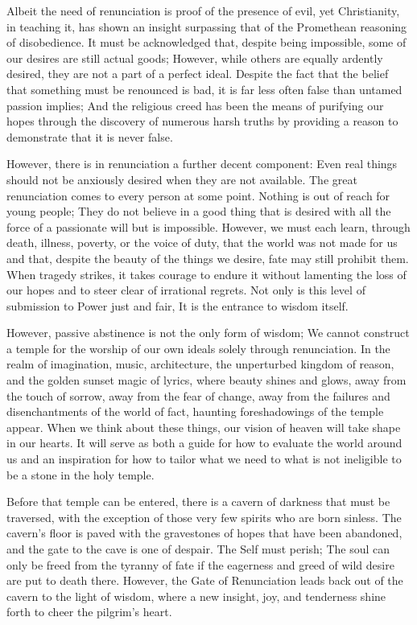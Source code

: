 \documentclass[a4paper,12pt]{book}[2004/02/16]
\theoremstyle{ilemma}
\theoremstyle{itheorem}
\theoremstyle{iother}
\theoremstyle{icorollary}
\theoremstyle{numcorollary}
\theoremstyle{idefinition}
\begin{document}
Albeit the need of renunciation is proof of the presence of
evil, yet Christianity, in teaching it, has shown an insight surpassing
that of the Promethean reasoning of disobedience. It must be acknowledged that, despite being impossible, some of our desires are still actual goods; However, while others are equally ardently desired, they are not a part of a perfect ideal. Despite the fact that the belief that something must be renounced is bad, it is far less often false than untamed passion implies; And the religious creed has been the means of purifying our hopes through the discovery of numerous harsh truths by providing a reason to demonstrate that it is never false.

However, there is in renunciation a further decent component: Even real things should not be anxiously desired when they are not available. The great renunciation comes to every person at some point. Nothing is out of reach for young people; They do not believe in a good thing that is desired with all the force of a passionate will but is impossible. However, we must each learn, through death, illness, poverty, or the voice of duty, that the world was not made for us and that, despite the beauty of the things we desire, fate may still prohibit them. When tragedy strikes, it takes courage to endure it without lamenting the loss of our hopes and to steer clear of irrational regrets. Not only is this level of submission to Power just and fair, It is the entrance to wisdom itself.

However, passive abstinence is not the only form of wisdom; We cannot construct a temple for the worship of our own ideals solely through renunciation. In the realm of imagination, music, architecture, the unperturbed kingdom of reason, and the golden sunset magic of lyrics, where beauty shines and glows, away from the touch of sorrow, away from the fear of change, away from the failures and disenchantments of the world of fact, haunting foreshadowings of the temple appear. When we think about these things, our vision of heaven will take shape in our hearts. It will serve as both a guide for how to evaluate the world around us and an inspiration for how to tailor what we need to what is not ineligible to be a stone in the holy temple.

Before that temple can be entered, there is a cavern of darkness that must be traversed, with the exception of those very few spirits who are born sinless.
The cavern's floor is paved with the gravestones of hopes that have been abandoned, and the gate to the cave is one of despair. The Self must perish; The soul can only be freed from the tyranny of fate if the eagerness and greed of wild desire are put to death there. However, the Gate of Renunciation leads back out of the cavern to the light of wisdom, where a new insight, joy, and tenderness shine forth to cheer the pilgrim's heart.
\end{document}
